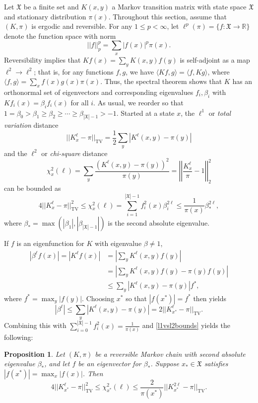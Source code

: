 \documentclass[11pt]{article}
\newcommand{\mf}{\mathfrak}
\newcommand{\RR}{\mathbb{R}}
\newcounter{r}
\newcounter{s}
\numberwithin{equation}{section}
\newtheorem{proposition}[theorem]{Proposition}
\begin{document}
Let $\mf{X}$ be a finite set and $K(x, y)$ a Markov transition matrix with state space $\mf{X}$ and stationary distribution $\pi(x)$. Throughout this section, assume that $(K, \pi)$ is ergodic and reversible. For any $1 \le p < \infty$, let $\ell^p(\pi) = \{f: \mf{X} \to \RR\}$ denote the function space with norm
\[
    ||f||_p^p = \sum_x |f(x)|^p \pi(x).
\]
Reversibility implies that $Kf(x) = \sum_y K(x, y) f(y)$ is self-adjoint as a map $\ell^2 \to \ell^2$; that is, for any functions $f, g$, we have $\langle Kf, g \rangle = \langle f, Kg \rangle$, where $\langle f, g \rangle = \sum_x f(x) g(x) \pi(x)$. Thus, the spectral theorem shows that $K$ has an orthonormal set of eigenvectors and corresponding eigenvalues $f_i, \beta_i$ with $Kf_i(x) = \beta_i f_i(x)$ for all $i$. As usual, we reorder so that $1 = \beta_0 > \beta_1 \ge \beta_2 \ge \cdots \ge \beta_{|\mf{X}| - 1} > -1$. Started at a state $x$, the $\ell^1$ or \textit{total variation} distance 
\[
    ||K_x^\ell - \pi||_{\text{TV}} = \frac{1}{2} \sum_y |K^\ell(x, y) - \pi(y)|
\]
and the $\ell^2$ or \textit{chi-square} distance 
\[
    \chi_x^2(\ell) = \sum_y \frac{(K^\ell(x, y) - \pi(y))^2}{\pi(y)} = \left|\left|\frac{K_x^\ell}{\pi} - 1\right|\right|_2^2
\]
can be bounded as 
\begin{equation}\label{l1vsl2bounds}
4||K_x^\ell - \pi||_{\text{TV}}^2 \le \chi_x^2(\ell) = \sum_{i=1}^{|\mf{X}| - 1} f_i^2(x) \beta_i^{2\ell} \le \frac{1}{\pi(x)} \beta_\ast^{2\ell},
\end{equation}
where $\beta_\ast = \max(|\beta_1|, |\beta_{|\mf{X}| - 1}|)$ is the second absolute eigenvalue.

If $f$ is an eigenfunction for $K$ with eigenvalue $\beta \ne 1$, 
\begin{align*}
    |\beta^\ell f(x)| = \left|K^\ell f(x)\right| &= \left|\sum_y K^\ell(x, y) f(y) \right| \\
    &= \left|\sum_y K^\ell(x, y) f(y) - \pi(y) f(y) \right| \\
    &\le \sum_y |K^\ell(x, y) - \pi(y)| f^\ast,
\end{align*}
where $f^\ast = \max_y |f(y)|$. Choosing $x^\ast$ so that $|f(x^\ast)| = f^\ast$ then yields
\[
    |\beta^\ell| \le \sum_y |K^\ell(x, y) - \pi(y)| = 2 ||K_{x^\ast}^\ell - \pi||_{\text{TV}}.
\]
Combining this with $\sum_{i=0}^{|\mf{X}| - 1} f_i^2(x) = \frac{1}{\pi(x)}$ and \cref{l1vsl2bounds} yields the following:

\begin{proposition}\label{twosidedl1l2bound}
Let $(K, \pi)$ be a reversible Markov chain with second absolute eigenvalue $\beta_\ast$, and let $f$ be an eigenvector for $\beta_\ast$. Suppose $x_\ast \in \mf{X}$ satisfies $|f(x^\ast)| = \max_x |f(x)|$. Then 
\[
    4||K_{x^\ast}^\ell - \pi||_{\text{TV}}^2 \le \chi_{x^\ast}^2(\ell) \le \frac{2}{\pi(x^\ast)} ||K_{x^\ast}^{2\ell} - \pi||_{\text{TV}}.
\]  
\end{proposition}
\end{document}
